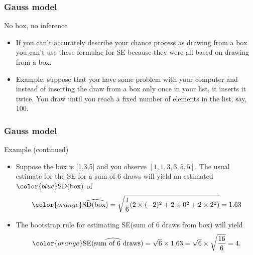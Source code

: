 \documentclass[handout]{beamer}
\begin{document}

   \begin{frame} \frametitle{Gauss model}

   \begin{block}
     {No box, no inference}
     \begin{itemize}
     \item If you can't accurately describe your chance process as
     drawing from a box
     you can't use these formulae for SE because they were all
     based on drawing from a box.

     \item Example: suppose that you have some problem with your
     computer and instead of inserting the draw from a box only once
     in your list, it inserts it twice. You draw until you reach
     a fixed number of elements in the list, say, 100.
     \end{itemize}
   \end{block}
   \end{frame}


   \begin{frame} \frametitle{Gauss model}

   \begin{block}
     {Example (continued)}
     \begin{itemize}
     \item Suppose the box is [1,3,5] and you observe $[1,1,3,3,5,5]$.
     The usual estimate for the SE for a sum of 6 draws will
     yield an estimated ${\color{blue} \text{SD(box)}}$ of
     $$
     {\color{orange} \widehat{\text{SD(box)}}} = \sqrt{\frac{1}{6} (2 \times (-2)^2 + 2 \times 0^2 + 2 \times 2^2)} = 1.63
     $$
     \item The bootstrap rule for estimating {\color{blue} SE(sum of 6 draws from box)} will yield
       $$
       {\color{orange} \widehat{\text{SE(sum of 6 draws)}}} = \sqrt{6} \times 1.63 = \sqrt{6} \times \sqrt{\frac{16}{6}} = 4.
       $$

     \end{itemize}
   \end{block}
   \end{frame}

\end{document}
